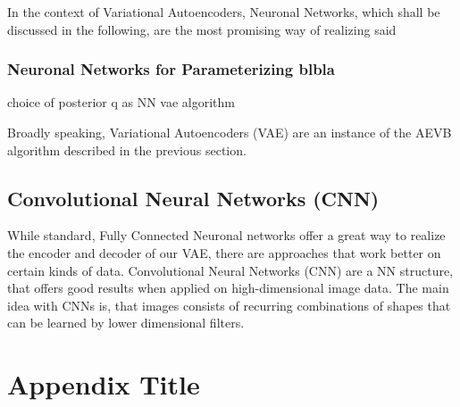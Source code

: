 \documentclass[12pt]{report}
\begin{document}
In the context of Variational Autoencoders, Neuronal Networks, which shall be discussed in the following, are the most promising way of realizing said 

\subsection{Neuronal Networks for Parameterizing blbla}
choice of posterior q as NN
vae algorithm

Broadly speaking, Variational Autoencoders (VAE) are an instance of the AEVB algorithm described in the previous section.


\section{Convolutional Neural Networks (CNN)}
While standard, Fully Connected Neuronal networks offer a great way to realize the encoder and decoder of our VAE, there are approaches that work better on certain kinds of data. Convolutional Neural Networks (CNN) are a NN structure, that offers good results when applied on high-dimensional image data. The main idea with CNNs is, that images consists of recurring combinations of shapes that can be learned by lower dimensional filters. %

\appendix
\chapter{Appendix Title}
%
\end{document}
